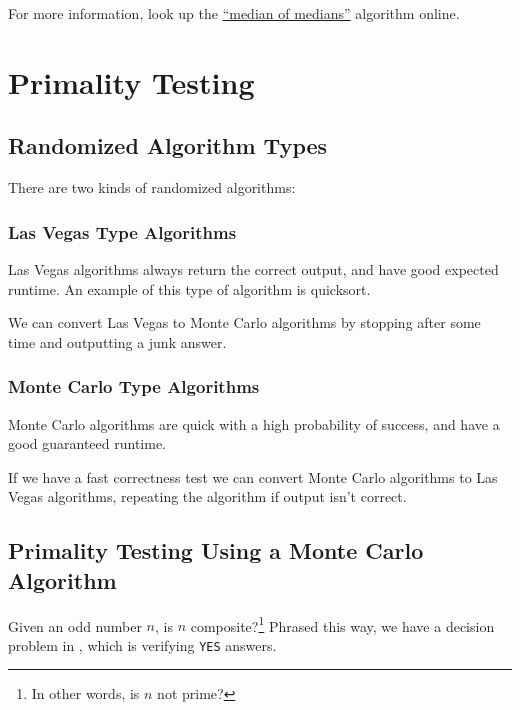                     For more information, look up the \href{https://en.wikipedia.org/wiki/Median_of_medians}{``median of medians''} algorithm online.

        \chapter{Primality Testing} %
        \label{cha:primality_testing}
            \section{Randomized Algorithm Types} %
            \label{sec:randomized_algorithm_types}
                There are two kinds of randomized algorithms:
                \subsection{Las Vegas Type Algorithms} %
                \label{sub:las_vegas}
                    Las Vegas algorithms always return the correct output, and have good expected runtime.
                    An example of this type of algorithm is quicksort.

                    We can convert Las Vegas to Monte Carlo algorithms by stopping after some time and outputting a junk answer.
                \subsection{Monte Carlo Type Algorithms} %
                \label{sub:monte_carlo_type}
                    Monte Carlo algorithms are quick with a high probability of success, and have a good guaranteed runtime.

                    If we have a fast correctness test we can convert Monte Carlo algorithms to Las Vegas algorithms, repeating the algorithm if output isn't correct.
            \section{Primality Testing Using a Monte Carlo Algorithm} %
            \label{sec:primality_testing_using_a_monte_carlo_algorithm}
                Given an odd number $n$, is $n$ composite?\footnote{In other words, is $n$ not prime?}
                Phrased this way, we have a decision problem in \np, which is verifying \verb|YES| answers.

